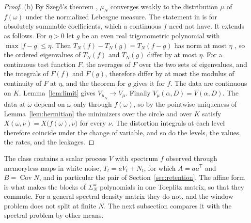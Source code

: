 \documentclass[11pt,onecolumn]{IEEEtran}
\newcommand{\Cov}{\operatorname{Cov}}
\begin{document}
\begin{proof}
(b) By
Szeg\H{o}'s theorem \cite[Ch.~5]{grenander1958}, $\mu_N$ converges weakly to the
distribution $\mu$ of $f(\omega)$ under the normalized Lebesgue measure.
The statement in \cite[Theorem~4.2]{gray2006} is for absolutely
summable coefficients, which a continuous $f$ need not have. It extends
as follows. For $\eta>0$ let $g$ be an even real trigonometric
polynomial with $\max|f-g|\le\eta$. Then $T_N(f)-T_N(g)=T_N(f-g)$ has
norm at most $\eta$ \cite[Lemma~4.1]{gray2006}, so the ordered
eigenvalues of $T_N(f)$ and $T_N(g)$ differ by at most $\eta$. For a
continuous test function $F$, the averages of $F$ over the two sets of
eigenvalues, and the integrals of $F(f)$ and $F(g)$, therefore differ
by at most the modulus of continuity of $F$ at $\eta$, and the theorem
for $g$ gives it for $f$.
The data are continuous on $K$. Lemma~\ref{lem:limit} gives
$V_{\mu_N}\to V_\mu$. Finally $V_\mu(\alpha,D)=V(\alpha,D)$. The data at
$\omega$ depend on $\omega$ only through $f(\omega)$, so by the
pointwise uniqueness of Lemma~\ref{lem:hermitian} the minimizers over
the circle and over $K$ satisfy
$X(\omega,\nu)=X\bigl(f(\omega),\nu\bigr)$ for every $\nu$. The
distortion integrals at each level therefore coincide under the change
of variable, and so do the levels, the values, the rates, and the
leakages.
\end{proof}

The class contains a scalar process $V$ with spectrum $f$ observed
through memoryless maps in white noise, $T_t=aV_t+N_t$, for which
$A=aa^{\mathsf T}$ and $B=\Cov N$, and in particular the pair of
Section~\ref{sec:retention}. The affine form is what makes the blocks of
$\Sigma^{\mathrm w}_N$ polynomials in one Toeplitz matrix, so that they
commute. For a general spectral density matrix they do not, and the
window problem does not split at finite $N$. The next subsection
compares it with the spectral problem by other means.
\end{document}
